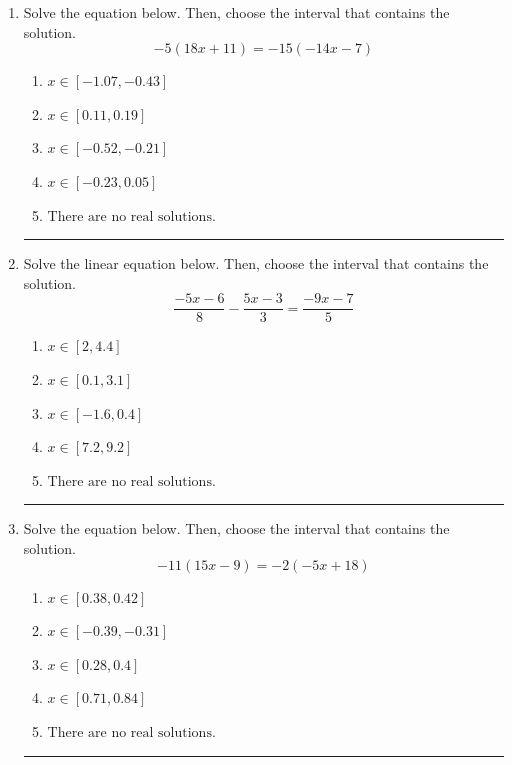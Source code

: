 \documentclass[14pt]{extbook}
\newcommand{\litem}[1]{\item#1\hspace*{-1cm}\rule{\textwidth}{0.4pt}}
\begin{document}
\begin{enumerate}
\litem{
Solve the equation below. Then, choose the interval that contains the solution.\[ -5(18x + 11) = -15(-14x -7) \]\begin{enumerate}[label=\Alph*.]
\item \( x \in [-1.07, -0.43] \)
\item \( x \in [0.11, 0.19] \)
\item \( x \in [-0.52, -0.21] \)
\item \( x \in [-0.23, 0.05] \)
\item \( \text{There are no real solutions.} \)

\end{enumerate} }
\litem{
Solve the linear equation below. Then, choose the interval that contains the solution.\[ \frac{-5x -6}{8} - \frac{5x -3}{3} = \frac{-9x -7}{5} \]\begin{enumerate}[label=\Alph*.]
\item \( x \in [2, 4.4] \)
\item \( x \in [0.1, 3.1] \)
\item \( x \in [-1.6, 0.4] \)
\item \( x \in [7.2, 9.2] \)
\item \( \text{There are no real solutions.} \)

\end{enumerate} }
\litem{
Solve the equation below. Then, choose the interval that contains the solution.\[ -11(15x -9) = -2(-5x + 18) \]\begin{enumerate}[label=\Alph*.]
\item \( x \in [0.38, 0.42] \)
\item \( x \in [-0.39, -0.31] \)
\item \( x \in [0.28, 0.4] \)
\item \( x \in [0.71, 0.84] \)
\item \( \text{There are no real solutions.} \)


\end{enumerate}}
\end{enumerate}
\end{document}

